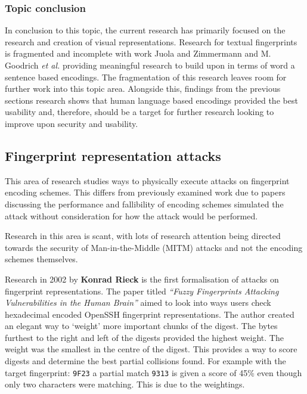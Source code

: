\subsubsection{Topic conclusion}

In conclusion to this topic, the current research has primarily focused on the research and creation of visual representations. Research for textual fingerprints is fragmented and incomplete with work Juola and Zimmermann 
\cite{juola1996whole} and M. Goodrich \textit{et al.}\cite{goodrich2006loud} providing meaningful research to build upon in terms of word a sentence based encodings. The fragmentation of this research leaves room for further work into this topic area. Alongside this, findings from the previous sections research shows that human language based encodings provided the best usability and, therefore, should be a target for further research looking to improve upon security and usability.

\subsection{Fingerprint representation attacks}
This area of research studies ways to physically execute attacks on fingerprint encoding schemes. This differs from previously examined work due to papers discussing the performance and fallibility of encoding schemes simulated the attack without consideration for how the attack would be performed.

Research in this area is scant, with lots of research attention being directed towards the security of Man-in-the-Middle (MITM) attacks and not the encoding schemes themselves.

Research in 2002 by \textbf{Konrad Rieck}\cite{rieck2002fuzzy} is the first formalisation of attacks on fingerprint representations. The paper titled \textit{``Fuzzy Fingerprints Attacking Vulnerabilities in the Human Brain''}
aimed to look into ways users check hexadecimal encoded OpenSSH fingerprint representations. The author created an elegant way to `weight' more important chunks of the digest. The bytes furthest to the right and left of the digests provided the highest weight. The weight was the smallest in the centre of the digest. This provides a way to score digests and determine the best partial collisions found. For example with the target fingerprint: \verb|9F23| a partial match \verb|9313| is given a score of 45\% even though only two characters were matching. This is due to the weightings.

